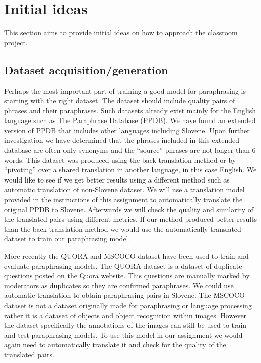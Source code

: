 \documentclass[fleqn,moreauthors,10pt]{ds_report}
\begin{document}

\section*{Initial ideas}
This section aims to provide initial ideas on how to approach the classroom project.

\subsection{Dataset acquisition/generation}
Perhaps the most important part of training a good model for paraphrasing is starting with the right dataset. The dataset should include quality pairs of phrases and their paraphrases. Such datasets already exist mainly for the English language such as The Paraphrase Database (PPDB)\cite{ganitkevitch2013ppdb}. We have found an extended version of PPDB that includes other languages including Slovene\cite{ganitkevitch2014multilingual}. Upon further investigation we have determined that the phrases included in this extended database are often only synonyms and the “source” phrases are not longer than 6 words. This dataset was produced using the back translation method or by “pivoting” over a shared translation in another language, in this case English. We would like to see if we get better results using a different method such as automatic translation of non-Slovene dataset. We will use a translation model provided in the instructions of this assignment \cite{Slovene_nmt} to automatically translate the original PPDB to Slovene. Afterwards we will check the quality and similarity of the translated pairs using different metrics. If our method produced better results than the back translation method we would use the automatically translated dataset to train our paraphrasing model.

More recently the QUORA\cite{sambit7_quora_dataset} and MSCOCO\cite{lin2014microsoft} dataset have been used to train and evaluate paraphrasing models. The QUORA dataset is a dataset of duplicate questions posted on the Quora website. This questions are manually marked by moderators as duplicates so they are confirmed paraphrases. We could use automatic translation to obtain paraphrasing pairs in Slovene. The MSCOCO dataset is not a dataset originally made for paraphrasing or language processing rather it is a dataset of objects and object recognition within images. However the dataset specifically the annotations of the images can still be used to train and test paraphrasing models. To use this model in our assignment we would again need to automatically translate it and check for the quality of the translated pairs.
\end{document}
